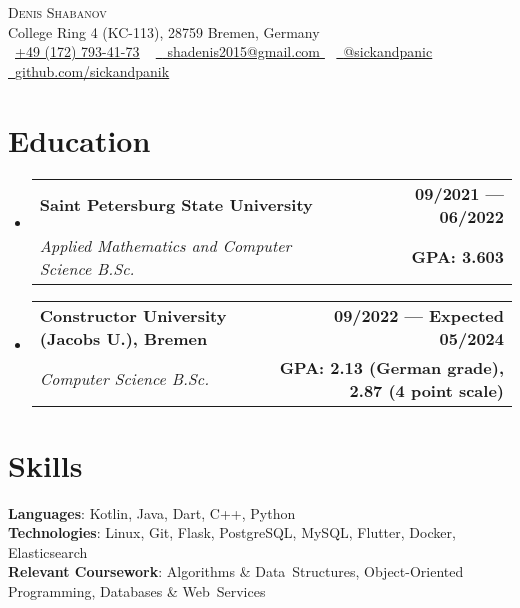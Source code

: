 \documentclass[a4,12pt]{article}
\makeatletter
\newcommand{\resumeSubheading}[4]{
  \vspace{-2pt}\item
    \begin{tabular*}{1.0\textwidth}[t]{l@{\extracolsep{\fill}}r}
      \textbf{#1} & \textbf{\small #2} \\
      \textit{\small#3} & \textbf{\small #4} \\
    \end{tabular*}\vspace{-7pt}
}
\newcommand{\resumeSubHeadingListStart}{\begin{itemize}[leftmargin=0.0in, label={}]}
\newcommand{\resumeSubHeadingListEnd}{\end{itemize}}
\makeatother
\begin{document}

\begin{center}
    {\Huge \scshape Denis Shabanov} \\ \vspace{1pt}
    College Ring 4 (KC-113), 28759 Bremen, Germany \\ \vspace{1pt}
    \small \raisebox{-0.1\height}\faPhone\
    \href{tel:+491727934173}{\underline{+49 (172) 793-41-73}} ~
    \href{
    mailto:shadenis2015@gmail.com
    }{\raisebox{-0.2\height}\faEnvelope\  \underline{
    shadenis2015@gmail.com
    }} ~ 
    \href{https://t.me/sickandpanic}{\raisebox{-0.2\height}\faSend\ \underline{@sickandpanic}}  ~
    \href{https://github.com/sickandpanik}{\raisebox{-0.2\height}\faGithub\ \underline{github.com/sickandpanik}}
    \vspace{-8pt}
\end{center}


\section{Education}
  \resumeSubHeadingListStart
    \resumeSubheading
      {Saint Petersburg State University}{09/2021 — 06/2022}
      {Applied Mathematics and Computer Science B.Sc.}{GPA: 3.603}
    \resumeSubheading
      {Constructor University (Jacobs U.), Bremen}{09/2022 — Expected 05/2024}
      {Computer Science B.Sc.}{GPA: 2.13 (German grade), 2.87 (4 point scale)}
  \resumeSubHeadingListEnd
  

\section{Skills}
 \begin{itemize}[leftmargin=0.15in, label={}]
    \small{\item{
     \textbf{Languages}{: Kotlin, Java, Dart, C++, Python} \\
     \textbf{Technologies}{: Linux, Git, Flask, PostgreSQL, MySQL, Flutter, Docker, Elasticsearch} \\
     \textbf{Relevant Coursework}{: Algorithms \& Data~Structures, Object-Oriented Programming, Databases \& Web~Services} \\
     }}
 \end{itemize}
 \vspace{-16pt}
\end{document}
